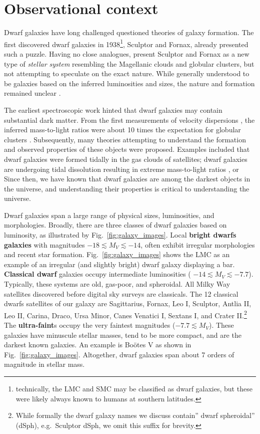 \section{Observational context}\label{observational-context}

Dwarf galaxies have long challenged questioned theories of galaxy
formation. The first discovered dwarf galaxies in 1938\footnote{technically,
  the LMC and SMC may be classified as dwarf galaxies, but these were
  likely always known to humans at southern latitudes.}, Sculptor and
Fornax, already presented such a puzzle. Having no close analogues,
\citet{shapley1938} present Sculptor and Fornax as a new type of
\emph{stellar system} resembling the Magellanic clouds and globular
clusters, but not attempting to speculate on the exact nature. While
generally understood to be galaxies based on the inferred luminosities
and sizes, the nature and formation remained unclear
\citep[e.g.,][]{hodge1971}.

The earliest spectroscopic work hinted that dwarf galaxies may contain
substantial dark matter. From the first measurements of velocity
dispersions
\citep[e.g.,][]{aaronson1983, gallagher+wyse1994, pryor1996}, the
inferred mass-to-light ratios were about 10 times the expectation for
globular clusters \citep{matteo1998}. Subsequently, many theories
attempting to understand the formation and observed properties of these
objects were proposed. Examples included that dwarf galaxies were formed
tidally in the gas clouds of satellites; dwarf galaxies are undergoing
tidal dissolution resulting in extreme mass-to-light ratios
\citep[e.g.,][]{pryor1996}, or Since then, we have known that dwarf
galaxies are among the darkest objects in the universe, and
understanding their properties is critical to understanding the
universe.

Dwarf galaxies span a large range of physical sizes, luminosities, and
morphologies. Broadly, there are three classes of dwarf galaxies based
on luminosity, as illustrated by Fig.~\ref{fig:galaxy_images}. Local
\textbf{bright dwarfs galaxies} with magnitudes
\(-18 \lesssim M_V \lesssim  -14\), often exhibit irregular morphologies
and recent star formation. Fig.~\ref{fig:galaxy_images} shows the LMC as
an example of an irregular (and slightly bright) dwarf galaxy displaying
a bar. \textbf{Classical dwarf} galaxies occupy intermediate
luminosities ( \(-14 \lesssim M_V  \lesssim -7.7\)). Typically, these
systems are old, gas-poor, and spheroidal. All Milky Way satellites
discovered before digital sky surveys are classicals. The 12 classical
dwarfs satellites of our galaxy are Sagittarius, Fornax, Leo I,
Sculptor, Antlia II, Leo II, Carina, Draco, Ursa Minor, Canes Venatici
I, Sextans I, and Crater II.\footnote{While formally the dwarf galaxy
  names we discuss contain'' dwarf spheroidal'' (dSph), e.g.~Sculptor
  dSph, we omit this suffix for brevity.} The \textbf{ultra-faint}s
occupy the very faintest magnitudes (\(-7.7 \lesssim M_V\)). These
galaxies have minuscule stellar masses, tend to be more compact, and are
the darkest known galaxies. An example is Boötes V as shown in
Fig.~\ref{fig:galaxy_images}. Altogether, dwarf galaxies span about 7
orders of magnitude in stellar mass.


